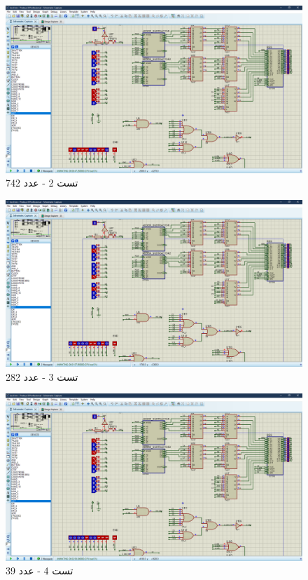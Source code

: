 \documentclass[fleqn]{article}
\begin{document}
\begin{figure}[!htbp]
    \includegraphics[width=\textwidth]{Assets/t2.png}
    \caption{تست 2 - عدد 742}
    \label{t2}
\end{figure}

\begin{figure}[!htbp]
    \includegraphics[width=\textwidth]{Assets/t3.png}
    \caption{تست 3 - عدد 282}
    \label{t3}
\end{figure}

\begin{figure}[!htbp]
    \includegraphics[width=\textwidth]{Assets/t4.png}
    \caption{تست 4 - عدد 39}
    \label{t4}
\end{figure}
\end{document}
